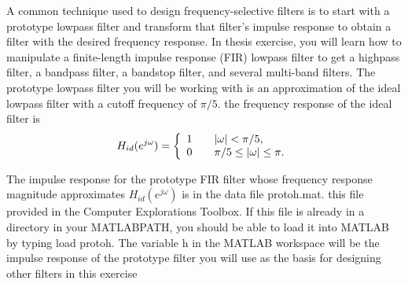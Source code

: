 A common technique used to design frequency-selective filters is to start with a prototype lowpass filter and transform that filter's impulse response to obtain a filter with the desired frequency response. In thesis exercise, you will learn how to manipulate a finite-length impulse response (FIR) lowpass filter to get a highpass filter, a bandpass filter, a bandstop filter, and several multi-band filters. The prototype lowpass filter you will be working with is an approximation of the ideal lowpass filter with a cutoff frequency of $\pi/5$. the frequency response of the ideal filter is 
\\
\[ H_{id}(e^{j \omega}) = \left\{
  \begin{array}{l l}
    1 & \quad \text{$ |\omega| < \pi/5$,} \\
    0 & \quad \text{$\pi/5 \le |\omega| \le \pi$.}
  \end{array} \right.\]
  

The impulse response for the prototype FIR filter whose frequency response magnitude approximates $H_{id}(e^{j\omega}) $ is in the data file protoh.mat. this file provided in the Computer Explorations Toolbox. If this file is already in a directory in your MATLABPATH, you should be able to load it into MATLAB by typing load protoh. The variable h in the MATLAB workspace will be the impulse response of the prototype filter you will use as the basis for designing other filters in this exercise \\

